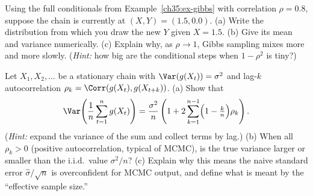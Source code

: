 \begin{exercise}
\label{ch35:exr-gibbs}
Using the full conditionals from Example~\ref{ch35:ex-gibbs} with correlation
$\rho = 0.8$, suppose the chain is currently at $(X, Y) = (1.5, 0.0)$. (a) Write
the distribution from which you draw the new $Y$ given $X = 1.5$. (b) Give its
mean and variance numerically. (c) Explain why, as $\rho \to 1$, Gibbs sampling
mixes more and more slowly. (\emph{Hint:} how big are the conditional steps when
$1-\rho^2$ is tiny?)
\end{exercise}

\begin{exercise}
\label{ch35:exr-diagnose}
Let $X_1, X_2, \dots$ be a stationary chain with $\Var(g(X_t)) = \sigma^2$ and
lag-$k$ autocorrelation $\rho_k = \Corr(g(X_t), g(X_{t+k}))$. (a) Show that
\[
  \Var\!\left(\frac1n\sum_{t=1}^n g(X_t)\right)
  = \frac{\sigma^2}{n}\left(1 + 2\sum_{k=1}^{n-1}\Bigl(1 - \tfrac{k}{n}\Bigr)\rho_k\right).
\]
(\emph{Hint:} expand the variance of the sum and collect terms by lag.) (b) When
all $\rho_k > 0$ (positive autocorrelation, typical of MCMC), is the true variance
larger or smaller than the i.i.d.\ value $\sigma^2/n$? (c) Explain why this means
the naive standard error $\hat\sigma/\sqrt n$ is overconfident for MCMC output,
and define what is meant by the ``effective sample size.''
\end{exercise}
